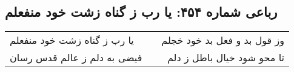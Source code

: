 \begin{center}
\section*{رباعی شماره ۴۵۴: یا رب ز گناه زشت خود منفعلم}
\label{sec:sh454}
\begin{longtable}{l p{0.5cm} r}
یا رب ز گناه زشت خود منفعلم
&&
وز قول بد و فعل بد خود خجلم
\\
فیضی به دلم ز عالم قدس رسان
&&
تا محو شود خیال باطل ز دلم
\\
\end{longtable}
\end{center}
